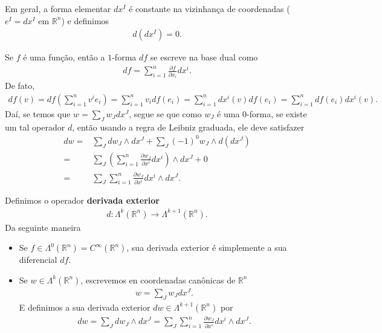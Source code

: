 Em geral, a forma elementar $dx^{I}$ é constante na vizinhança de coordenadas ($e^{I}=dx^{I}$ em $\mathbb{R}^{n}$) e definimos
\begin{align*}
  d(dx^{I})=0.
\end{align*}
\begin{proposition}[Propriedades]
  Se $f$ é uma função, então a $1$-forma $df$ se escreve na base dual como
  \begin{align*}
    df=\sum_{i=1}^{n}\frac{\partial f}{\partial x_i}dx^{i}.
  \end{align*}
  De fato,
  \begin{align*}
    df(v)=df\left( \sum_{i=1}^{n}v^{i}e_i \right)=\sum_{i=1}^{n}v_idf(e_i)=\sum_{i=1}^{n}dx^{i}(v)df(e_i)=\sum_{i=1}^{n}df(e_i)dx^{i}(v).
  \end{align*}
  Daí, se temos que $w=\sum_{J}w_Jdx^{J}$, segue se que como $w_J$ é uma $0$-forma, se existe um tal operador $d$, então usando a regra de Leibniz graduada, ele deve satisfazer
  \begin{align*}
    dw=&\sum_{J}dw_J\wedge dx^{J}+\sum_{J}(-1)^{0}w_J\wedge d(dx^{J})\\
    =&\sum_{J}\left(\sum_{i=1}^{n}\frac{\partial w_J}{\partial x^{i}}dx^{i} \right)\wedge dx^{J}+0\\
    =&\sum_{J}\sum_{i=1}^{n}\frac{\partial w_J}{\partial x^{i}}dx^{i}\wedge dx^{J}.
  \end{align*}
\end{proposition}
\begin{definition}
  Definimos o operador \textbf{derivada exterior}
  \begin{align*}
    d:\Lambda^{k}(\mathbb{R}^{n})\to\Lambda^{k+1}(\mathbb{R}^{n}).
  \end{align*}
  Da seguinte maneira
  \begin{itemize}
    \item Se $f\in\Lambda^{0}(\mathbb{R}^{n})=C^{\infty}(\mathbb{R}^{n})$, sua derivada exterior é simplemente a sua diferencial $df$.
    \item Se $w\in\Lambda^{k}(\mathbb{R}^{n})$, escrevemos en coordenadas canônicas de $\mathbb{R}^{n}$
      \begin{align*}
        w=\sum_{J}w_Jdx^{J}.
      \end{align*}
      E definimos a sua derivada exterior $dw\in\Lambda^{k+1}(\mathbb{R}^{n})$ por
      \begin{align*}
        dw=\sum_{J}dw_J\wedge dx^{J}=\sum_{J}\sum_{i=1}^{n}\frac{\partial w_J}{\partial x^{i}}dx^{i}\wedge dx^{J}.
      \end{align*}
  \end{itemize}
\end{definition}
